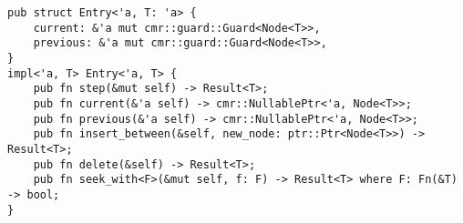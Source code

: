 \begin{lstlisting}[style=Rust,caption=Partial \code{Entry} API from the List implementation.,
                   label={lst:list-entry}]
pub struct Entry<'a, T: 'a> {
    current: &'a mut cmr::guard::Guard<Node<T>>,
    previous: &'a mut cmr::guard::Guard<Node<T>>,
}
impl<'a, T> Entry<'a, T> {
    pub fn step(&mut self) -> Result<T>;
    pub fn current(&'a self) -> cmr::NullablePtr<'a, Node<T>>;
    pub fn previous(&'a self) -> cmr::NullablePtr<'a, Node<T>>;
    pub fn insert_between(&self, new_node: ptr::Ptr<Node<T>>) -> Result<T>;
    pub fn delete(&self) -> Result<T>;
    pub fn seek_with<F>(&mut self, f: F) -> Result<T> where F: Fn(&T) -> bool;
}
\end{lstlisting}
